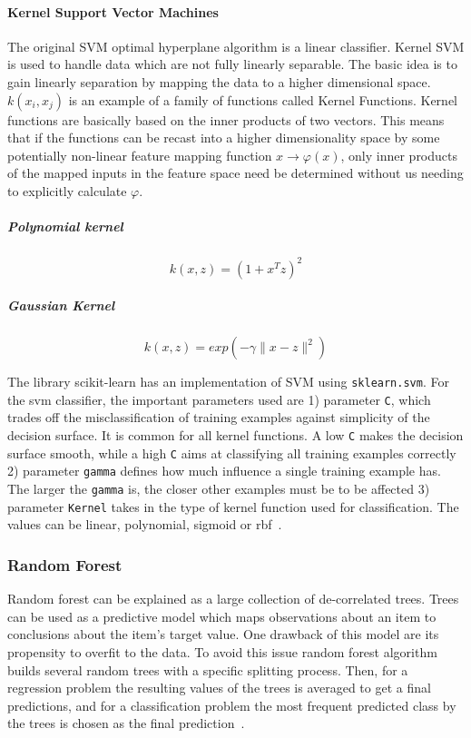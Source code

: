 \documentclass[letterpaper,10pt]{article}
\theoremstyle{mytheor}
\begin{document}
\paragraph{Kernel Support Vector Machines}
The original SVM optimal hyperplane algorithm is a linear classifier. Kernel SVM is used to handle data which are not fully linearly separable. The basic idea is to gain linearly separation by mapping the data to a higher dimensional space. $k(x_i, x_j)$ is an example of a family of functions called Kernel Functions. Kernel functions are basically based on the inner products of two vectors. This means that if the functions can be recast into a higher dimensionality space by some potentially non-linear feature mapping function $x \rightarrow \varphi(x)$, only inner products of the mapped inputs in the feature space need be determined without us needing to explicitly calculate $\varphi$.

\subparagraph{Polynomial kernel}
\begin{equation}
k(x, z) = (1 + x^T z)^2
\end{equation}

\subparagraph{Gaussian Kernel}
\begin{equation}
k(x, z) = exp(-\gamma\|x-z\|^2)
\end{equation}

The library scikit-learn has an implementation of SVM using \lstinline|sklearn.svm|. For the svm classifier, the important  parameters used are 1) parameter \lstinline|C|, which trades off the misclassification of training examples against simplicity of the decision surface. It is common for all kernel functions. A low \lstinline|C| makes the decision surface smooth, while a high \lstinline|C| aims at classifying all training examples correctly 2) parameter \lstinline|gamma| defines how much influence a single training example has. The larger the \lstinline|gamma| is, the closer other examples must be to be affected 3) parameter \lstinline|Kernel| takes in the type of kernel function used for classification. The values can be linear, polynomial, sigmoid or rbf~\cite{svmsklearn}.


\subsubsection{Random Forest}
Random forest can be explained as a large collection of de-correlated trees. Trees can be used as a predictive model which maps observations about an item to conclusions about the item's target value. One drawback of this model are its propensity  to overfit to the data. To avoid this issue random forest algorithm builds several random trees with a specific splitting process. Then, for a regression problem the resulting values of the trees is averaged to get a final predictions, and for a classification problem the most frequent predicted class by the trees is chosen as the final prediction~\cite{friedman2001elements}. 
\end{document}
